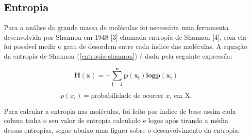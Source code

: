 \subsection{Entropia}

Para a análise da grande massa de moléculas foi necessária uma ferramenta
desenvolvida por Shannon em 1948 [3] chamada entropia de Shannon [4], com ela foi
possível medir o grau de desordem entre cada índice das moléculas. A equação da entropia de
Shannon (\ref{entropia-shannon}) é dada pela seguinte expressão:

\begin{equation}
    \label{entropia-shannon}
    \mathbf{H(x) = -\sum\limits_{i=1}^{n}p(x_i)log p(x_i)}
\end{equation}

$$p(x_i)=\text{probabilidade de ocorrer } x_i\text{ em X.}$$

Para calcular a entropia nas moléculas, foi feito por índice de base assim cada
coluna tinha o seu valor de entropia calculado e logos após tirando a média dessas
entropias, segue abaixo uma figura sobre o desenvolvimento da entropia: